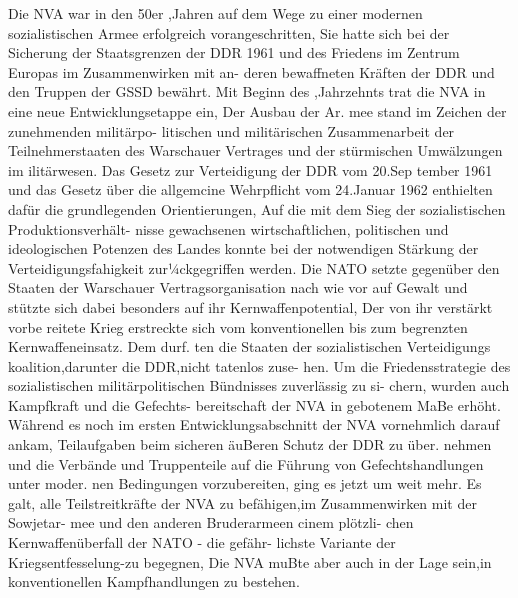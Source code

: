 

Die NVA war in den 50er ,Jahren auf dem Wege zu
einer modernen sozialistischen Armee erfolgreich
vorangeschritten, Sie hatte sich bei der Sicherung
der Staatsgrenzen der DDR 1961 und des Friedens
im Zentrum Europas im Zusammenwirken mit an-
deren bewaffneten Kräften der DDR und den
Truppen der GSSD bewährt.
Mit Beginn des ,Jahrzehnts trat die NVA in eine
neue Entwicklungsetappe ein, Der Ausbau der Ar.
mee stand im Zeichen der zunehmenden militärpo-
litischen und militärischen Zusammenarbeit der
Teilnehmerstaaten des Warschauer Vertrages und
der stürmischen Umwälzungen im ilitärwesen.
Das Gesetz zur Verteidigung der DDR vom 20.Sep
tember 1961 und das Gesetz über die allgemcine
Wehrpflicht vom 24.Januar 1962 enthielten dafür
die grundlegenden Orientierungen, Auf die mit
dem Sieg der sozialistischen Produktionsverhält-
nisse gewachsenen wirtschaftlichen, politischen und
ideologischen Potenzen des Landes konnte bei der
notwendigen Stärkung der Verteidigungsfahigkeit
zur¼ckgegriffen werden.
Die NATO setzte gegenüber den Staaten der
Warschauer Vertragsorganisation nach wie vor auf Gewalt und stützte sich dabei besonders auf ihr
Kernwaffenpotential, Der von ihr verstärkt vorbe
reitete Krieg erstreckte sich vom konventionellen
bis zum begrenzten Kernwaffeneinsatz. Dem durf.
ten die Staaten der sozialistischen Verteidigungs
koalition,darunter die DDR,nicht tatenlos zuse-
hen. Um die Friedensstrategie des sozialistischen
militärpolitischen Bündnisses zuverlässig zu si-
chern, wurden auch Kampfkraft und die Gefechts-
bereitschaft der NVA in gebotenem MaBe erhöht.
Während es noch im ersten Entwicklungsabschnitt
der NVA vornehmlich darauf ankam, Teilaufgaben
beim sicheren äuBeren Schutz der DDR zu über.
nehmen und die Verbände und Truppenteile auf
die Führung von Gefechtshandlungen unter moder.
nen Bedingungen vorzubereiten, ging es jetzt um
weit mehr. Es galt, alle Teilstreitkräfte der NVA zu
befähigen,im Zusammenwirken mit der Sowjetar-
mee und den anderen Bruderarmeen cinem plötzli-
chen Kernwaffenüberfall der NATO - die gefähr-
lichste Variante der Kriegsentfesselung-zu
begegnen, Die NVA muBte aber auch in der Lage
sein,in konventionellen Kampfhandlungen zu bestehen.


